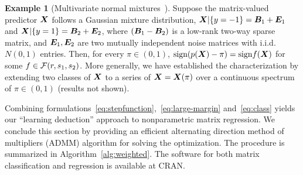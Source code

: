 \documentclass[11pt]{article}
\theoremstyle{definition}
\newtheorem{example}{Example}
\def\sign{\textup{sign}}
\begin{document}
\begin{example}[Multivariate normal mixtures~\citep{hu2020matrix}] Suppose the matrix-valued predictor $\bm X$ follows a Gaussian mixture distribution, $\bm X|\{y=-1\}=\bm B_1+\bm{E}_1$ and $ \bm X|\{y=1\}=\bm B_2+\bm{E}_2$, where $(\bm B_1-\bm B_2)$ is a low-rank two-way sparse matrix, and $\bm{E}_1, \bm{E}_2$ are two mutually independent noise matrices with i.i.d.\ $N(0,1)$ entries. Then, for every $\pi\in(0,1)$, $\sign(p(\mX)-\pi)= \sign f(\mX)$ for some $f\in \mathcal{F}(r,s_1,s_2)$. More generally, we have established the characterization by extending two classes of $\bm X$ to a series of $\bm X=\bm X(\pi)$ over a continuous spectrum of $\pi \in (0,1)$ (results not shown). 

\end{example}

Combining formulations~\eqref{eq:stepfunction},~\eqref{eq:large-margin} and~\eqref{eq:class} yields our ``learning deduction'' approach to nonparametric matrix regression.
 We conclude this section by providing an efficient alternating direction method of multipliers (ADMM) algorithm for solving the optimization. The procedure is summarized in Algorithm~\ref{alg:weighted}. The software for both matrix classification and regression is available at CRAN.
 
\end{document}
